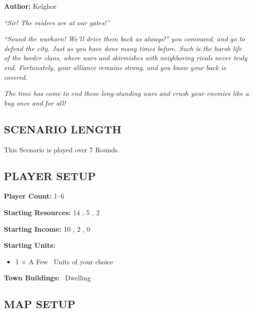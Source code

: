 
\begin{multicols}{2}

\textbf{Author:} Kelghor

\textit{``Sir! The raiders are at our gates!''}

\textit{``Sound the warhorn! We'll drive them back as always!'' you command, and go to defend the city. Just as you have done many times before. Such is the harsh life of the border clans, where wars and skirmishes with neighboring rivals never truly end. Fortunately, your alliance remains strong, and you know your back is covered.}

\textit{The time has come to end these long-standing wars and crush your enemies like a bug once and for all!}

\subsection*{\MakeUppercase{Scenario Length}}

This Scenario is played over 7 Rounds.

\subsection*{\MakeUppercase{Player Setup}}

\textbf{Player Count:} 1--6

\textbf{Starting Resources:} 14 , 5 , 2 

\textbf{Starting Income:} 10 , 2 , 0 

\textbf{Starting Units:}
\begin{itemize}
  \item  1 × A Few \bronze\ Units of your choice
\end{itemize}

\textbf{Town Buildings:} \bronze\ Dwelling

\subsection*{\MakeUppercase{Map Setup}}


\end{multicols}
